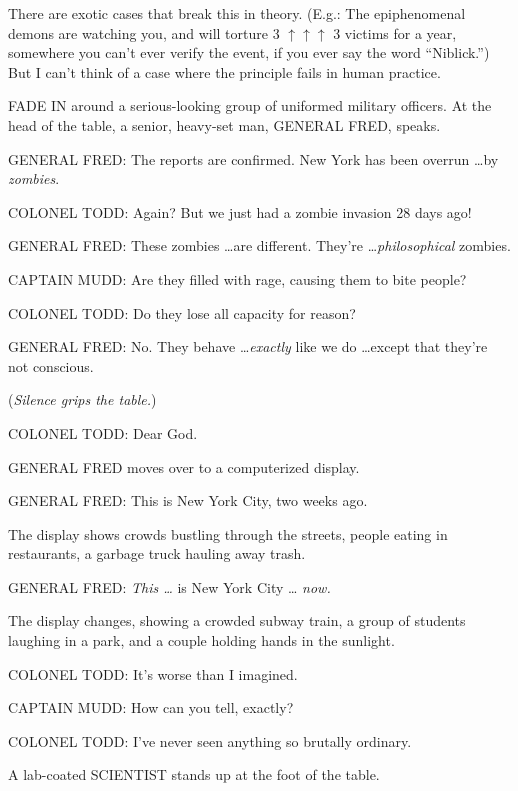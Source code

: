 {
 There are exotic cases that break this in theory. (E.g.: The
epiphenomenal demons are watching you, and will torture 3 $\uparrow
\uparrow \uparrow $ 3 victims for a year, somewhere you
can't ever verify the event, if you ever say the word
``Niblick.'') But I
can't think of a case where the principle fails in
human practice.}

\myendsectiontext


{
 FADE IN around a serious-looking group of uniformed military
officers. At the head of the table, a senior, heavy-set man, GENERAL
FRED, speaks.}

{
 GENERAL FRED: The reports are confirmed. New York has been overrun
\ldots by \textit{zombies}.}

{
 COLONEL TODD: Again? But we just had a zombie invasion 28 days
ago!}

{
 GENERAL FRED: These zombies \ldots are different.
They're \ldots \textit{philosophical} zombies.}

{
 CAPTAIN MUDD: Are they filled with rage, causing them to bite
people?}

{
 COLONEL TODD: Do they lose all capacity for reason?}

{
 GENERAL FRED: No. They behave \ldots \textit{exactly} like we do
\ldots except that they're not conscious.}

{
 (\textit{Silence grips the table.})}

{
 COLONEL TODD: Dear God.}

{
 GENERAL FRED moves over to a computerized display.}

{
 GENERAL FRED: This is New York City, two weeks ago.}

{
 The display shows crowds bustling through the streets, people
eating in restaurants, a garbage truck hauling away trash.}

{
 GENERAL FRED: \textit{This \ldots} is New York City \ldots
\textit{now.}}

{
 The display changes, showing a crowded subway train, a group of
students laughing in a park, and a couple holding hands in the
sunlight.}

{
 COLONEL TODD: It's worse than I imagined.}

{
 CAPTAIN MUDD: How can you tell, exactly?}

{
 COLONEL TODD: I've never seen anything so brutally
ordinary.}

{
 A lab-coated SCIENTIST stands up at the foot of the table.}

